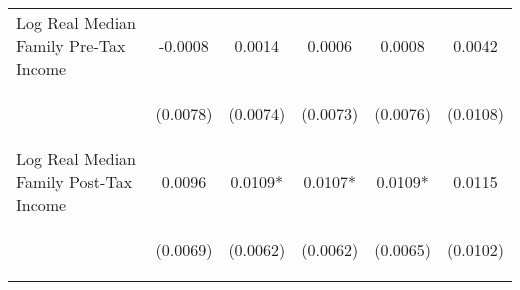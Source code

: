 \begin{center}
\begin{tabular}{lccccc}
\noalign{\smallskip}Log Real Median Family Pre-Tax Income & \begin{scriptsize}-0.0008\end{scriptsize} & \begin{scriptsize}0.0014\end{scriptsize} & \begin{scriptsize}0.0006\end{scriptsize} & \begin{scriptsize}0.0008\end{scriptsize} & \begin{scriptsize}0.0042\end{scriptsize}\\
 & \begin{scriptsize}(0.0078)\end{scriptsize} & \begin{scriptsize}(0.0074)\end{scriptsize} & \begin{scriptsize}(0.0073)\end{scriptsize} & \begin{scriptsize}(0.0076)\end{scriptsize} & \begin{scriptsize}(0.0108)\end{scriptsize}\\
\noalign{\smallskip}Log Real Median Family Post-Tax Income & \begin{scriptsize}0.0096\end{scriptsize} & \begin{scriptsize}0.0109*\end{scriptsize} & \begin{scriptsize}0.0107*\end{scriptsize} & \begin{scriptsize}0.0109*\end{scriptsize} & \begin{scriptsize}0.0115\end{scriptsize}\\
 & \begin{scriptsize}(0.0069)\end{scriptsize} & \begin{scriptsize}(0.0062)\end{scriptsize} & \begin{scriptsize}(0.0062)\end{scriptsize} & \begin{scriptsize}(0.0065)\end{scriptsize} & \begin{scriptsize}(0.0102)\end{scriptsize}\\

\end{tabular}
\end{center}
